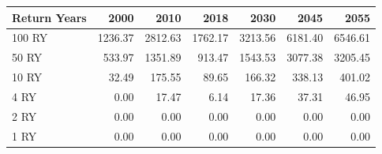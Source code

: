 \begin{table}[htbp]
\centering
{}
\label{tab:return_years_cr}
\small
\begin{tabular}{lrrrrrr}
\toprule
\textbf{Return Years} & \textbf{2000} & \textbf{2010} & \textbf{2018} & \textbf{2030} & \textbf{2045} & \textbf{2055} \\
\midrule
100 RY & 1236.37 & 2812.63 & 1762.17 & 3213.56 & 6181.40 & 6546.61 \\
50 RY & 533.97 & 1351.89 & 913.47 & 1543.53 & 3077.38 & 3205.45 \\
10 RY & 32.49 & 175.55 & 89.65 & 166.32 & 338.13 & 401.02 \\
4 RY & 0.00 & 17.47 & 6.14 & 17.36 & 37.31 & 46.95 \\
2 RY & 0.00 & 0.00 & 0.00 & 0.00 & 0.00 & 0.00 \\
1 RY & 0.00 & 0.00 & 0.00 & 0.00 & 0.00 & 0.00 \\
\bottomrule
\end{tabular}
\end{table}
